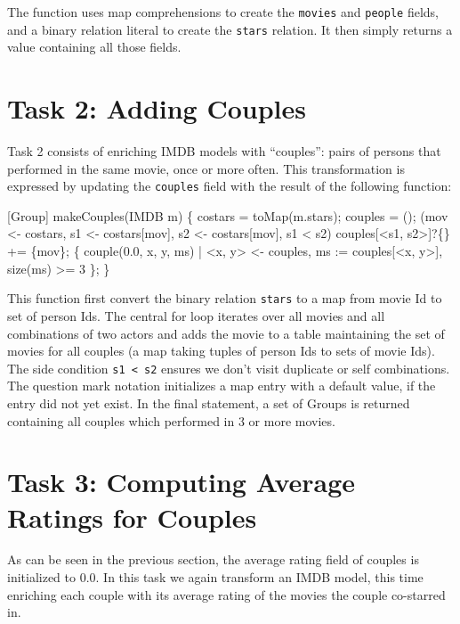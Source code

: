 \documentclass[submission,copyright,creativecommons]{eptcs}
\begin{document}
The function uses map comprehensions to create the \texttt{movies} and \texttt{people} fields, and a binary relation literal to create the \texttt{stars} relation. It then simply returns a value containing all those fields.



\section*{Task 2: Adding Couples}

Task 2 consists of enriching IMDB models with ``couples'': pairs of persons that performed in the same movie, once or more often. This transformation is expressed by updating the \texttt{couples} field with the result of the following function:

\begin{rascal}
[Group] makeCouples(IMDB m) \{{}
    costars = toMap(m.stars); couples = ();
     (mov \textless{}- costars, s1 \textless{}- costars{}[mov], s2 \textless{}- costars{}[mov], s1 \textless{} s2) 
       couples{}[\textless{}s1, s2\textgreater{}]?\{\} += \{{}mov\}{};
     \{{} couple(0.0, x, y, ms) 
                     | \textless{}x, y\textgreater{} \textless{}- couples, ms := couples{}[\textless{}x, y\textgreater{}], size(ms) \textgreater{}= 3 \}{};
\}{}
\end{rascal}

This function first convert the binary relation \texttt{stars} to a map from movie Id to set of person Ids. The central for loop iterates over all movies and all combinations of two actors and adds the movie to a table maintaining the set of movies for all couples (a map taking tuples of person Ids to sets of movie Ids). The side condition \texttt{s1 \textless{} s2} ensures we don't visit duplicate or self combinations.
The question mark notation initializes a map entry with a default value, if the entry did not yet exist.
In the final statement, a set of Groups is returned containing all couples which performed in 3 or more movies.




\section*{Task 3: Computing Average Ratings for Couples}

As can be seen in the previous section, the average rating field of couples is initialized to 0.0. In this task we again transform an IMDB model, this time enriching each couple with its average rating of the movies the couple co-starred in. 
\end{document}
